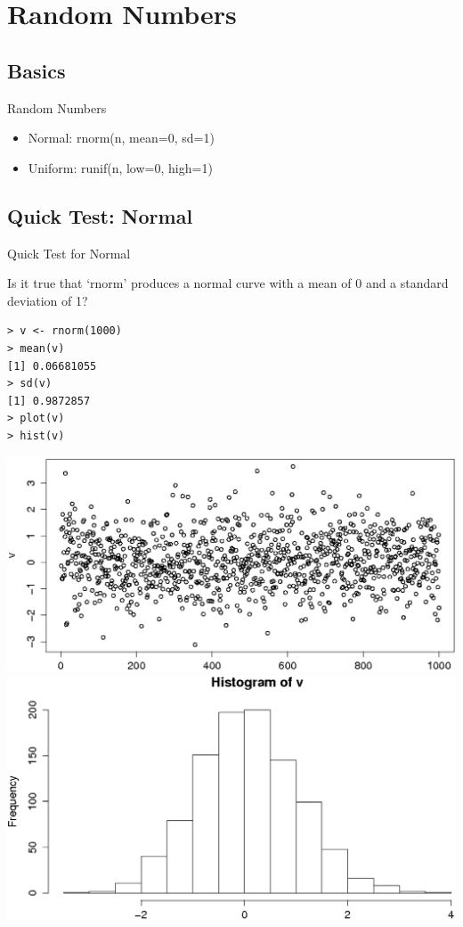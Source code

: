 \documentclass{beamer}
\begin{document}
\section{Random Numbers}

\subsection{Basics}

\begin{frame}[fragile]{Random Numbers}
    \begin{itemize}
        \item Normal: rnorm(n, mean=0, sd=1)
        \item Uniform: runif(n, low=0, high=1)
    \end{itemize}
\end{frame}

\subsection{Quick Test: Normal}
\begin{frame}[fragile]{Quick Test for Normal}

Is it true that `rnorm' produces a normal curve with a mean of 0 and a standard deviation of 1?

\begin{footnotesize}
\begin{verbatim}
> v <- rnorm(1000)
> mean(v)
[1] 0.06681055
> sd(v)
[1] 0.9872857
> plot(v)
> hist(v)
\end{verbatim}
\end{footnotesize}

\includegraphics[scale=0.24]{normal_plot.eps}
\includegraphics[scale=0.24]{normal_hist.eps}

\end{frame}
\end{document}
